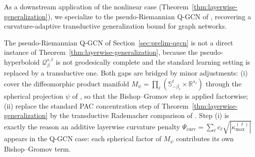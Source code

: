 \documentclass[letterpaper]{article}
\begin{document}
As a downstream application of the nonlinear case
(Theorem~\ref{thm:layerwise-generalization}), we specialize to the
pseudo-Riemannian Q-GCN of \cite{xiong2022pseudo}, recovering a
curvature-adaptive transductive generalization bound for graph networks.

The pseudo-Riemannian Q-GCN of Section~\ref{sec:prelim-qgcn} is not a
direct instance of Theorem~\ref{thm:layerwise-generalization}, because
the pseudo-hyperboloid $\mathcal Q_\beta^{s,t}$ is not geodesically
complete and the standard learning setting is replaced by a transductive
one. Both gaps are bridged by minor adjustments: \textup{(i)} cover the
diffeomorphic product manifold
$M_\psi = \prod_\ell (\mathbb S^t_{-\beta_\ell} \times \mathbb R^{s_\ell})$
through the spherical projection $\psi$ of \cite{xiong2022pseudo}, so
that the Bishop--Gromov step is applied factorwise; \textup{(ii)} replace
the standard PAC concentration step of
Theorem~\ref{thm:layerwise-generalization} by the transductive Rademacher
comparison of \cite[Theorem~4.3]{tang2023towards}. Step \textup{(i)} is
exactly the reason an additive layerwise curvature penalty
$\Psi_{\mathrm{curv}} = \sum_\ell c_\ell \sqrt{|\kappa^{(\ell)}_{\max}|}$
appears in the Q-GCN case: each spherical factor of $M_\psi$ contributes
its own Bishop--Gromov term.
\end{document}
